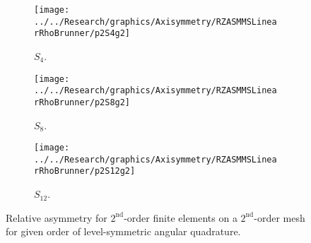 \documentclass[12pt]{article}
\begin{document}
\begin{sidewaysfigure}[!htb]
\centering
\begin{subfigure}{0.33\textwidth}
\texttt{[image: ../../Research/graphics/Axisymmetry/RZASMMSLinearRhoBrunner/p2S4g2]}
\caption{$S_4$.}
\end{subfigure}%
\begin{subfigure}{0.33\textwidth}
\texttt{[image: ../../Research/graphics/Axisymmetry/RZASMMSLinearRhoBrunner/p2S8g2]}
\caption{$S_8$.}
\end{subfigure}%
\begin{subfigure}{0.33\textwidth}
\texttt{[image: ../../Research/graphics/Axisymmetry/RZASMMSLinearRhoBrunner/p2S12g2]}
\caption{$S_{12}$.}
\end{subfigure}
\caption{Relative asymmetry for $2^\text{nd}$-order finite elements on a $2^\text{nd}$-order mesh for given order of level-symmetric angular quadrature.}
\label{fig:RZASMMSLinearRhoBrunnerp2g2}
\end{sidewaysfigure}
\end{document}
